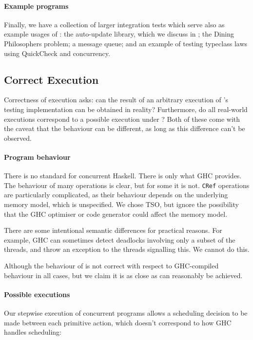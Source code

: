 \paragraph{Example programs}
Finally, we have a collection of larger integration tests which serve
also as example usages of \dejafu{}: the auto-update\cite{auto_update}
library, which we discuss in ; the Dining
Philosophers problem; a message queue; and an example of testing
typeclass laws using QuickCheck\cite{claessen2000} and concurrency.

\subsection{Correct Execution}

Correctness of execution asks: can the result of an arbitrary
execution of \dejafu{}'s testing implementation can be obtained in
reality?  Furthermore, do all real-world executions correspond to a
possible execution under \dejafu{}?  Both of these come with the
caveat that the behaviour can be different, as long as this difference
can't be observed.

\paragraph{Program behaviour}
There is no standard for concurrent Haskell.  There is only what GHC
provides.  The behaviour of many operations is clear, but for some it
is not.  \verb|CRef| operations are particularly complicated, as their
behaviour depends on the underlying memory model, which is
unspecified.  We chose TSO, but ignore the possibility that the GHC
optimiser or code generator could affect the memory model.

There are some intentional semantic differences for practical reasons.
For example, GHC can sometimes detect deadlocks involving only a
subset of the threads, and throw an exception to the threads
signalling this.  We cannot do this.

Although the behaviour of \dejafu{} is not correct with respect to
GHC-compiled behaviour in all cases, but we claim it is as close as
can reasonably be achieved.

\paragraph{Possible executions}
Our stepwise execution of concurrent programs allows a scheduling
decision to be made between each primitive action, which doesn't
correspond to how GHC handles scheduling:

